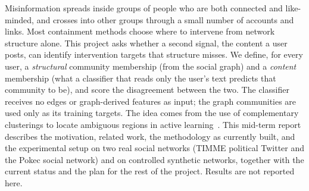 Misinformation spreads inside groups of people who are both connected and like-minded,
and crosses into other groups through a small number of accounts and links. Most
containment methods choose where to intervene from network structure alone. This
project asks whether a second signal, the content a user posts, can identify
intervention targets that structure misses. We define, for every user, a
\emph{structural} community membership (from the social graph) and a \emph{content}
membership (what a classifier that reads only the user's text predicts that community
to be), and score the disagreement between the two. The classifier receives no edges
or graph-derived features as input; the graph communities are used only as its
training targets. The idea comes from
the use of complementary clusterings to locate ambiguous regions in active
learning~\citep{sani2026aas}. This mid-term report describes the motivation, related
work, the methodology as currently built, and the experimental setup on two real
social networks (TIMME political Twitter and the Pokec social network) and on
controlled synthetic networks, together with the current status and the plan for the
rest of the project. Results are not reported here.
